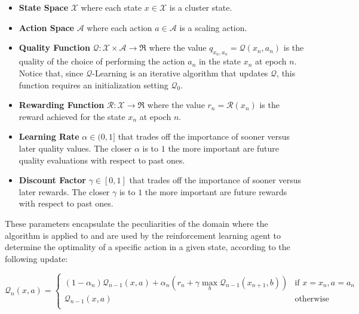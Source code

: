 \begin{itemize}
	
	\item \textbf{State Space} $\mathcal{X}$ where each state $x\in\mathcal{X}$ is a cluster state.
	
	\item \textbf{Action Space} $\mathcal{A}$ where each action $a\in\mathcal{A}$ is a scaling action.
	
	\item \textbf{Quality Function} $\mathcal{Q}:\mathcal{X}\times\mathcal{A}\rightarrow\Re$ where the value $q_{x_{n},a_{n}}=\mathcal{Q}(x_{n},a_{n})$ is the quality of the choice of performing the action $a_{n}$ in the state $x_{n}$ at epoch $n$.
	Notice that, since $\mathcal{Q}$-Learning is an iterative algorithm that updates $\mathcal{Q}$, this function requires an initialization setting $\mathcal{Q}_{0}$.
	
	\item \textbf{Rewarding Function} $\mathcal{R}:\mathcal{X}\rightarrow\Re$ where the value $r_{n}=\mathcal{R}(x_{n})$ is the reward achieved for the state $x_{n}$ at epoch $n$.
	
	\item \textbf{Learning Rate} $\alpha\in (0,1]$ that trades off the importance of sooner versus later quality values. The closer $\alpha$ is to $1$ the more important are future quality evaluations with respect to past ones.
	
	\item \textbf{Discount Factor} $\gamma\in [0,1]$ that trades off the importance of sooner versus later rewards. The closer $\gamma$ is to $1$ the more important are future rewards with respect to past ones. 
	
\end{itemize}

These parameters encapsulate the peculiarities of the domain where the algorithm is applied to and are used by the reinforcement learning agent to determine the optimality of a specific action in a given state, according to the following update:

\begin{equation}
\label{eqn:implementation-q-learning-update}
\mathcal{Q}_{n}(x,a) = 
\begin{cases} 
(1-\alpha_{n})\mathcal{Q}_{n-1}(x,a) + \alpha_{n}(r_{n} + \gamma\max_{b} \mathcal{Q}_{n-1}(x_{n+1},b)) & \text{if } x=x_{n},a=a_{n} \\
\mathcal{Q}_{n-1}(x,a)       & \text{otherwise}           \\
\end{cases}
\end{equation}

